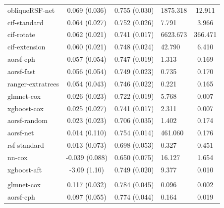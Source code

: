 \documentclass[twoside,11pt]{article}\usepackage[]{graphicx}\usepackage[]{xcolor}
\newenvironment{knitrout}{}{} %
\begin{document}
\begin{knitrout}
\begin{longtable}[t]{lcclc}
\hline
\hspace{1em}obliqueRSF-net & 0.069 (0.036) & 0.755 (0.030) & 1875.318 & 12.911\\
\hspace{1em}cif-standard & 0.064 (0.027) & 0.752 (0.026) & 7.791 & 3.966\\
\hspace{1em}cif-rotate & 0.062 (0.021) & 0.741 (0.017) & 6623.673 & 366.471\\
\hspace{1em}cif-extension & 0.060 (0.021) & 0.748 (0.024) & 42.790 & 6.410\\
\hspace{1em}aorsf-cph & 0.057 (0.054) & 0.747 (0.019) & 1.313 & 0.169\\
\hspace{1em}aorsf-fast & 0.056 (0.054) & 0.749 (0.023) & 0.735 & 0.170\\
\hspace{1em}ranger-extratrees & 0.054 (0.043) & 0.746 (0.022) & 0.221 & 0.165\\
\hspace{1em}glmnet-cox & 0.026 (0.023) & 0.722 (0.019) & 5.768 & 0.007\\
\hspace{1em}xgboost-cox & 0.025 (0.027) & 0.741 (0.017) & 2.311 & 0.007\\
\hspace{1em}aorsf-random & 0.023 (0.023) & 0.706 (0.035) & 1.402 & 0.174\\
\hspace{1em}aorsf-net & 0.014 (0.110) & 0.754 (0.014) & 461.060 & 0.176\\
\hspace{1em}rsf-standard & 0.013 (0.073) & 0.698 (0.053) & 0.327 & 0.451\\
\hspace{1em}nn-cox & -0.039 (0.088) & 0.650 (0.075) & 16.127 & 1.654\\
\hspace{1em}xgboost-aft & -3.09 (1.10) & 0.749 (0.020) & 9.377 & 0.010\\
\addlinespace[0.3em]
\hline
\multicolumn{5}{l}{\textit{\textbf{FCL; death, n = 541, p = 7}}}\\
\hline
\hspace{1em}glmnet-cox & 0.117 (0.032) & 0.784 (0.045) & 0.096 & 0.002\\
\hspace{1em}aorsf-cph & 0.097 (0.055) & 0.774 (0.044) & 0.164 & 0.019\\

\end{longtable}
\end{knitrout}
\end{document}
